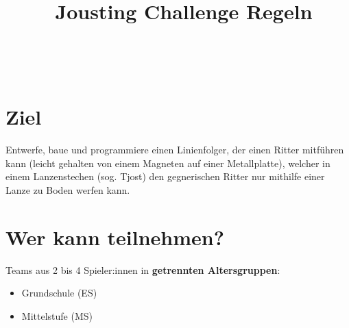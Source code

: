 \documentclass[a4paper,12pt]{article}
\begin{document}



\title{\tagYear\ Jousting Challenge Regeln}

\makeatletter
\let\inserttitle\@title
\makeatother
\begin{center}
	\rrgerLogo
	\huge                      %
	\bfseries                   %
	\\
	\inserttitle
\end{center}

\section{Ziel}
Entwerfe, baue und programmiere einen Linienfolger, der einen Ritter mitführen
kann (leicht gehalten von einem Magneten auf einer Metallplatte), welcher in
einem Lanzenstechen (sog. Tjost) den gegnerischen Ritter nur mithilfe einer
Lanze zu Boden werfen kann.

\section{Wer kann teilnehmen?}
Teams aus 2 bis 4 Spieler:innen in \textbf{getrennten Altersgruppen}:
\begin{itemize}
	\item Grundschule (ES)
	\item Mittelstufe (MS)
\end{itemize}
\combineDivisions
\end{document}
